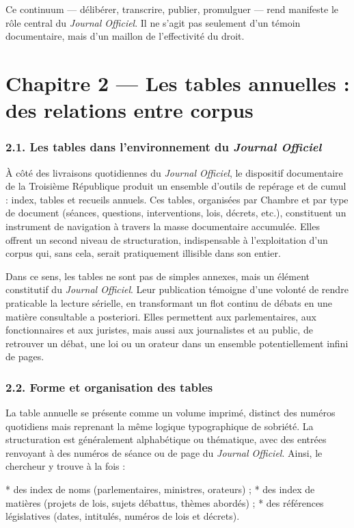 Ce continuum — délibérer, transcrire, publier, promulguer — rend manifeste le rôle central du \emph{Journal Officiel}. Il ne s’agit pas seulement d’un témoin documentaire, mais d’un maillon de l’effectivité du droit.

\chapter{Chapitre 2 — Les tables annuelles : des relations entre corpus}

\subsection{2.1. Les tables dans l’environnement du \emph{Journal Officiel}}

À côté des livraisons quotidiennes du \emph{Journal Officiel}, le dispositif documentaire de la Troisième République produit un ensemble d’outils de repérage et de cumul : index, tables et recueils annuels. Ces tables, organisées par Chambre et par type de document (séances, questions, interventions, lois, décrets, etc.), constituent un instrument de navigation à travers la masse documentaire accumulée. Elles offrent un second niveau de structuration, indispensable à l’exploitation d’un corpus qui, sans cela, serait pratiquement illisible dans son entier.

Dans ce sens, les tables ne sont pas de simples annexes, mais un élément constitutif du \emph{Journal Officiel}. Leur publication témoigne d’une volonté de rendre praticable la lecture sérielle, en transformant un flot continu de débats en une matière consultable a posteriori. Elles permettent aux parlementaires, aux fonctionnaires et aux juristes, mais aussi aux journalistes et au public, de retrouver un débat, une loi ou un orateur dans un ensemble potentiellement infini de pages.

\subsection{2.2. Forme et organisation des tables}

La table annuelle se présente comme un volume imprimé, distinct des numéros quotidiens mais reprenant la même logique typographique de sobriété. La structuration est généralement alphabétique ou thématique, avec des entrées renvoyant à des numéros de séance ou de page du \emph{Journal Officiel}. Ainsi, le chercheur y trouve à la fois :

* des index de noms (parlementaires, ministres, orateurs) ;
* des index de matières (projets de lois, sujets débattus, thèmes abordés) ;
* des références législatives (dates, intitulés, numéros de lois et décrets).

